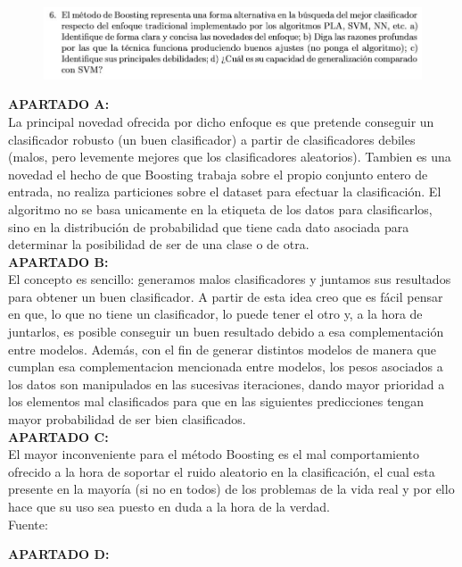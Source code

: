 \begin{figure}[H]
	\includegraphics[scale=0.65]{imagenes/6} 
\end{figure}


\textbf{APARTADO A:}\\ La principal novedad ofrecida por dicho enfoque es que pretende conseguir un clasificador robusto (un buen clasificador) a partir de clasificadores debiles (malos, pero levemente mejores que los clasificadores aleatorios). Tambien es una novedad el hecho de que Boosting trabaja sobre el propio conjunto entero de entrada, no realiza particiones sobre el dataset para efectuar la clasificación.
El algoritmo no se basa unicamente en la etiqueta de los datos para clasificarlos, sino en la distribución de probabilidad que tiene cada dato asociada para determinar la posibilidad de ser de una clase o de otra.\\

\textbf{APARTADO B:}\\ El concepto es sencillo: generamos malos clasificadores y juntamos sus resultados para obtener un buen clasificador. A partir de esta idea creo que es fácil pensar en que, lo que no tiene un clasificador, lo puede tener el otro y, a la hora de juntarlos, es posible conseguir un buen resultado debido a esa complementación entre modelos. Además, con el fin de generar distintos modelos de manera que cumplan esa complementacion mencionada entre modelos, los pesos asociados a los datos son manipulados en las sucesivas iteraciones, dando mayor prioridad a los elementos mal clasificados para que en las siguientes predicciones tengan mayor probabilidad de ser bien clasificados.\\

\textbf{APARTADO C:}\\ El mayor inconveniente para el método Boosting es el mal comportamiento ofrecido a la hora de soportar el ruido aleatorio en la clasificación, el cual esta presente en la mayoría (si no en todos) de los problemas de la vida real y por ello hace que su uso sea puesto en duda a la hora de la verdad.\\
Fuente:\cite{ref1}

\textbf{APARTADO D:}\\


